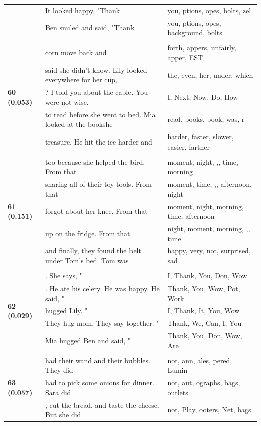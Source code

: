 \documentclass{article}
\theoremstyle{plain}
\theoremstyle{definition}
\theoremstyle{remark}
\begin{document}
\begin{longtable}{|p{}|p{}|p{}|}
& It looked happy.  "Thank & you, ptions, opes,  bolts, zel \\
& Ben smiled and said, "Thank & you, ptions, opes,  background,  bolts \\
& & \\
\multirow{5}{*}{\textbf{60 (0.053)}} & corn move back and & forth, appers,  unfairly, apper, EST \\
& said she didn't know.  Lily looked everywhere for her cup, & the,  even,  her,  under,  which \\
& ? I told you about the cable. You were not wise. & I,  Next,  Now,  Do,  How \\
& to read before she went to bed. Mia looked at the bookshe & read,  books,  book,  was, r \\
& treasure. He hit the ice harder and & harder,  faster,  slower,  easier,  farther \\
& & \\
\multirow{5}{*}{\textbf{61 (0.151)}} & too because she helped the bird. From that & moment,  night, ,,  time,  morning \\
& sharing all of their toy tools. From that & moment,  time, ,,  afternoon,  night \\
& forgot about her knee. From that & moment,  night,  morning,  time,  afternoon \\
& up on the fridge. From that & night,  moment,  morning, ,,  time \\
& and finally, they found the belt under Tom's bed. Tom was & happy,  very,  not,  surprised,  sad \\
& & \\
\multirow{5}{*}{\textbf{62 (0.029)}} & . She says, " & I, Thank, You, Don, Wow \\
& . He ate his celery. He was happy. He said, " & Thank, You, Wow, Pot, Work \\
& hugged Lily.  " & I, Thank, It, You, Wow \\
& They hug mom. They say together.  " & Thank, We, Can, I, You \\
& Mia hugged Ben and said, " & Thank, You, Don, Wow, Are \\
& & \\
\multirow{5}{*}{\textbf{63 (0.057)}} & had their wand and their bubbles. They did & not, ann, ales, pered,  Lumin \\
& had to pick some onions for dinner. Sara did & not,  aut, ographs, bags,  outlets \\
& , cut the bread, and taste the cheese. But she did & not, Play, ooters, Net, bags \\

\end{longtable}
\end{document}
